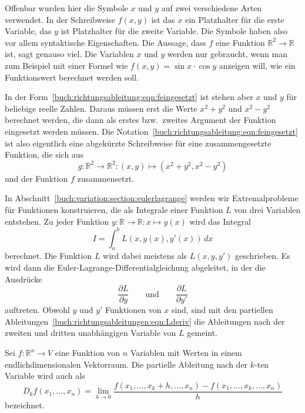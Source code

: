 Offenbar wurden hier die Symbole $x$ und $y$ auf zwei verschiedene
Arten verwendet.
In der Schreibweise $f(x,y)$ ist das $x$ ein Platzhalter für die
erste Variable, das $y$ ist Platzhalter für die zweite Variable.
Die Symbole haben also vor allem syntaktische Eigenschaften.
Die Aussage, dass $f$ eine Funktion $\mathbb{R}^2\to\mathbb{R}$
ist, sagt genauso viel.
Die Variablen $x$ und $y$ werden nur gebraucht, wenn man zum
Beispiel mit einer Formel wie $f(x,y)=\sin x\cdot\cos y$ 
anzeigen will, wie ein Funktionswert berechnet werden soll.

In der Form~\eqref{buch:richtungsableitung:eqn:feingesetzt} ist
stehen aber $x$ und $y$ für beliebige reelle Zahlen.
Daraus müssen erst die Werte $x^2+y^2$ und $x^2-y^2$ berechnet werden,
die dann als erstes bzw.~zweites Argument der Funktion eingesetzt
werden müssen.
Die Notation~\eqref{buch:richtungsableitung:eqn:feingesetzt} ist also
eigentlich eine abgekürzte Schreibweise für eine zusammengesetzte
Funktion, die sich aus
\[
g
\colon
\mathbb{R}^2 \to \mathbb{R}^2
:
(x,y) \mapsto (x^2+y^2,x^2-y^2)
\]
und der Funktion $f$ zusammensetzt.

\begin{beispiel}
\label{buch:richtungsableitung:bsp:L}
In Abschnitt~\ref{buch:variation:section:eulerlagrange} werden wir
Extremalprobleme für Funktionen konstruieren, die als Integrale
einer Funktion $L$ von drei Variablen entstehen.
Zu jeder Funktion $y\colon \mathbb{R}\to\mathbb{R}:x\mapsto y(x)$
wird das Integral
\begin{equation*}
I
=
\int_a^b L(x,y(x),y'(x))\,dx
\end{equation*}
berechnet.
Die Funktion $L$ wird dabei meistens als $L(x,y,y')$ geschrieben.
Es wird dann die  Euler-Lagrange-Differentialgleichung abgeleitet,
in der die Ausdrücke
\begin{equation}
\frac{\partial L}{\partial y}
\qquad\text{und}\qquad
\frac{\partial L}{\partial y'}
\label{buch:richtungsableitungen:eqn:Lderiv}
\end{equation}
auftreten.
Obwohl $y$ und $y'$ Funktionen von $x$ sind, sind mit den 
partiellen Ableitungen~\eqref{buch:richtungsableitungen:eqn:Lderiv}
die Ableitungen nach der zweiten und dritten unabhängigen Variable
von $L$ gemeint.
\end{beispiel}

\begin{definition}
\label{buch:richtungsableitung:def:D}
Sei $f\colon \mathbb{R}^n \to V$ eine Funktion von $n$ Variablen
mit Werten in einem endlichdimensionalen Vektorraum.
Die partielle Ableitung nach der $k$-ten Variable wird auch als
\[
D_kf(x_1,\dots,x_n)
=
\lim_{h\to 0}
\frac{f(x_1,\dots,x_k+h,\dots,x_n)-f(x_1,\dots,x_k,\dots,x_n)}{h}
\]
bezeichnet.
\end{definition}

